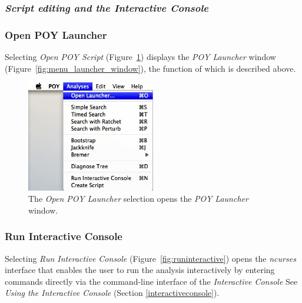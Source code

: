 {\subsubsection{\emph{Script editing and the Interactive Console}}

\subsubsection*{Open POY Launcher}

Selecting \emph{Open POY Script} (Figure~\ref{fig:open_poy_launcher}) displays the \emph{POY Launcher} 
window (Figure~\ref{fig:menu_launcher_window}), the function of which is described above.

\begin{figure}[htpb]
    \begin{center}
        \includegraphics[width=0.5\textwidth]{doc/figures/openpoylauncher_menu.jpg}
    \end{center}
    \caption{The \emph{Open POY Launcher} selection opens the \emph{POY Launcher} window.}
    \label{fig:open_poy_launcher}
\end{figure}

\subsubsection*{Run Interactive Console}

Selecting \emph{Run Interactive Console} (Figure~\ref{fig:runinteractive}) opens the \emph{ncurses} interface
that enables the user to run the analysis interactively by entering \poy commands directly via the command-line 
interface of the \emph{Interactive Console} See \emph{Using the Interactive Console} (Section \ref{interactiveconsole}).

}
